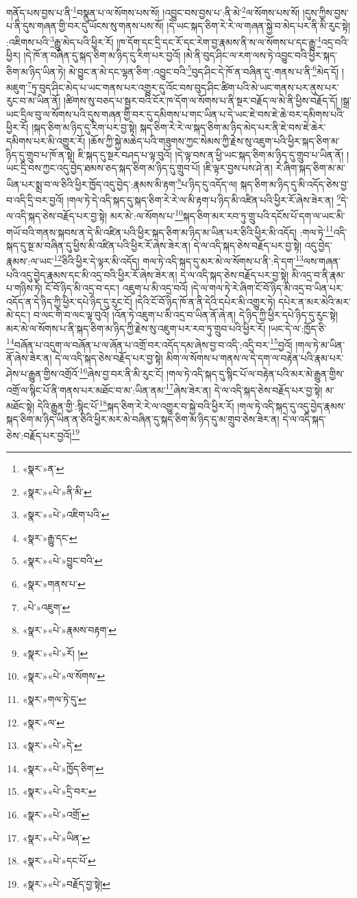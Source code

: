 གནོད་པས་བྱས་པ་ནི་\footnote{«སྣར་»ན་}བསྣུན་པ་ལ་སོགས་པས་སོ། །འབྱུང་བས་བྱས་པ་:ནི་མེ་\footnote{«སྣར་»«པེ་»ནི་མི་}ལ་སོགས་པས་སོ། །དུས་ཀྱིས་བྱས་པ་ནི་དུས་གཞན་གྱི་བར་དུ་ཡོངས་སུ་གནས་པས་སོ། །དེ་ཡང་སྐད་ཅིག་རེ་རེ་ལ་གཞན་སྐྱེ་བ་མེད་པར་ནི་མི་རུང་སྟེ། :འཇིགས་པའི་\footnote{«སྣར་»«པེ་»འཇིག་པའི་}རྒྱུ་མེད་པའི་ཕྱིར་རོ། །ཁ་དོག་དང་དྲི་དང་རོ་དང་རེག་བྱ་རྣམས་ནི་ས་ལ་སོགས་པ་དང་རྒྱུ་\footnote{«སྣར་»རྒྱུ་དང་}འདྲ་བའི་ཕྱིར། །དེ་ཁོ་ན་བཞིན་དུ་སྐད་ཅིག་མ་ཉིད་དུ་རིག་པར་བྱའོ། །མེ་ནི་བུད་ཤིང་ལ་རག་ལས་ཏེ་འབྱུང་བའི་ཕྱིར་སྐད་ཅིག་མ་ཉིད་ཡིན་ཏེ། མེ་བྱུང་ན་མེ་དང་ལྷན་ཅིག་:འབྱུང་བའི་\footnote{«སྣར་»«པེ་»བྱུང་བའི་}བུད་ཤིང་དེ་ཁོ་ན་བཞིན་དུ་:གནས་པ་ནི་\footnote{«སྣར་»གནས་པ་}མེད་དོ། །མཇུག་\footnote{«པེ་»འཇུག་}ཏུ་བུད་ཤིང་མེད་པ་ཡང་གནས་པར་འགྱུར་དུ་འོང་བས་བུད་ཤིང་ཚིག་པའི་མེ་ཡང་གནས་པར་ནུས་པར་རུང་བ་མ་ཡིན་ནོ། །ཚིགས་སུ་བཅད་པ་སྦྱར་བའི་ངོར་ཁ་དོག་ལ་སོགས་པ་ནི་སྔར་བརྗོད་ལ་མེ་ནི་ཕྱིས་བརྗོད་དོ། །སྒྲ་ཡང་དྲིལ་བུ་ལ་སོགས་པའི་དུས་གཞན་གྱི་བར་དུ་དམིགས་པ་གང་ཡིན་པ་དེ་ཡང་ཇེ་བས་ཇེ་ཆེ་བར་དམིགས་པའི་ཕྱིར་རོ། །སྐད་ཅིག་མ་ཉིད་དུ་རིག་པར་བྱ་སྟེ། སྐད་ཅིག་རེ་རེ་ལ་སྐད་ཅིག་མ་ཉིད་མེད་པར་ནི་ཇེ་བས་ཇེ་ཆེར་དམིགས་པར་མི་འགྱུར་རོ། །ཆོས་ཀྱི་སྐྱེ་མཆེད་པའི་གཟུགས་ཀྱང་སེམས་ཀྱི་རྗེས་སུ་འཇུག་པའི་ཕྱིར་སྐད་ཅིག་མ་ཉིད་དུ་གྲུབ་པ་ཁོ་ན་སྟེ། ཇི་སྐད་དུ་སྔར་བཤད་པ་ལྟ་བུའོ། །དེ་ལྟ་བས་ན་ཕྱི་ཡང་སྐད་ཅིག་མ་ཉིད་དུ་གྲུབ་པ་ཡིན་ནོ། །ཡང་དྲི་བས་ཀྱང་འདུ་བྱེད་ཐམས་ཅད་སྐད་ཅིག་མ་ཉིད་དུ་གྲུབ་པོ། །ཇི་ལྟར་བྱས་པས་ཤེ་ན། རེ་ཞིག་སྐད་ཅིག་མ་མ་ཡིན་པར་སྨྲ་བ་ལ་ཅིའི་ཕྱིར་ཁྱོད་འདུ་བྱེད་:རྣམས་མི་རྟག་\footnote{«སྣར་»«པེ་»རྣམས་བརྟག་}པ་ཉིད་དུ་འདོད་ལ། སྐད་ཅིག་མ་ཉིད་དུ་མི་འདོད་ཅེས་བྱ་བ་འདི་དྲི་བར་བྱའོ། །གལ་ཏེ་དེ་འདི་སྐད་དུ་སྐད་ཅིག་རེ་རེ་ལ་མི་རྟག་པ་ཉིད་མི་འཛིན་པའི་ཕྱིར་རོ་ཞེས་ཟེར་ན། \footnote{«སྣར་»«པེ་»རོ། ། }དེ་ལ་འདི་སྐད་ཅེས་བརྗོད་པར་བྱ་སྟེ། མར་མེ་:ལ་སོགས་པ་\footnote{«སྣར་»«པེ་»ལ་སོགས་}སྐད་ཅིག་མར་རབ་ཏུ་གྲུ་པའི་དངོས་པོ་དག་ལ་ཡང་མི་གཡོ་བའི་གནས་སྐབས་ན་དེ་མི་འཛིན་པའི་ཕྱིར་སྐད་ཅིག་མ་ཉིད་མ་ཡིན་པར་ཅིའི་ཕྱིར་མི་འདོད། :གལ་ཏེ་\footnote{«སྣར་»གལ་ཏེ་དུ་}འདི་སྐད་དུ་སྔ་མ་བཞིན་དུ་ཕྱིས་མི་འཛིན་པའི་ཕྱིར་རོ་ཞེས་ཟེར་ན། དེ་ལ་འདི་སྐད་ཅེས་བརྗོད་པར་བྱ་སྟེ། འདུ་བྱེད་རྣམས་:ལ་ཡང་\footnote{«སྣར་»ལ་}ཅིའི་ཕྱིར་དེ་ལྟར་མི་འདོད། གལ་ཏེ་འདི་སྐད་དུ་མར་མེ་ལ་སོགས་པ་ནི་:དེ་དག་\footnote{«སྣར་»«པེ་»དེ་}ལས་གཞན་པའི་འདུ་བྱེད་རྣམས་དང་མི་འདྲ་བའི་ཕྱིར་རོ་ཞེས་ཟེར་ན། དེ་ལ་འདི་སྐད་ཅེས་བརྗོད་པར་བྱ་སྟེ། མི་འདྲ་བ་ནི་རྣམ་པ་གཉིས་ཏེ། ངོ་བོ་ཉིད་མི་འདྲ་བ་དང་། འཇུག་པ་མི་འདྲ་བའོ། །དེ་ལ་གལ་ཏེ་རེ་ཞིག་ངོ་བོ་ཉིད་མི་འདྲ་བ་ཡིན་པར་འདོད་ན་དེ་ཉིད་ཀྱི་ཕྱིར་དཔེ་ཉིད་དུ་རུང་ངོ། །དེའི་ངོ་བོ་ཉིད་ཁོ་ན་ནི་དེའི་དཔེར་མི་འགྱུར་ཏེ། དཔེར་ན་མར་མེའི་མར་མེ་དང་། བ་ལང་གི་བ་ལང་ལྟ་བུའོ། །འོན་ཏེ་འཇུག་པ་མི་འདྲ་བ་ཡིན་ནོ་ཞེ་ན། དེ་ཉིད་ཀྱི་ཕྱིར་དཔེ་ཉིད་དུ་རུང་སྟེ། མར་མེ་ལ་སོགས་པ་ནི་སྐད་ཅིག་མ་ཉིད་ཀྱི་རྗེས་སུ་འཇུག་པར་རབ་ཏུ་གྲུབ་པའི་ཕྱིར་རོ། །ཡང་དེ་ལ་:ཁྱོད་ཅི་\footnote{«སྣར་»«པེ་»ཁྱོད་ཅིག་}བཞོན་པ་འདུག་ལ་བཞོན་པ་ལ་ཞོན་པ་འགྲོ་བར་འདོད་དམ་ཞེས་བྱ་བ་འདི་:འདྲི་བར་\footnote{«སྣར་»«པེ་»དྲི་བར་}བྱའོ། །གལ་ཏེ་མ་ཡིན་ནོ་ཞེས་ཟེར་ན། དེ་ལ་འདི་སྐད་ཅེས་བརྗོད་པར་བྱ་སྟེ། མིག་ལ་སོགས་པ་གནས་ལ་དེ་དག་ལ་བརྟེན་པའི་རྣམ་པར་ཤེས་པ་རྒྱུན་གྱིས་འགྲོའོ་\footnote{«སྣར་»«པེ་»འགྲོ་}ཞེས་བྱ་བར་ནི་མི་རུང་ངོ། །གལ་ཏེ་འདི་སྐད་དུ་སྙིང་པོ་ལ་བརྟེན་པའི་མར་མེ་རྒྱུན་གྱིས་འགྲོ་ལ་སྙིང་པོ་ནི་གནས་པར་མཐོང་བ་མ་:ཡིན་ནམ་\footnote{«སྣར་»«པེ་»ཡིན་}ཞེས་ཟེར་ན། དེ་ལ་འདི་སྐད་ཅེས་བརྗོད་པར་བྱ་སྟེ། མ་མཐོང་སྟེ། དེའི་རྒྱུན་གྱི་:སྙིང་པོ་\footnote{«སྣར་»«པེ་»དང་པོ་}སྐད་ཅིག་རེ་རེ་ལ་འགྱུར་བ་སྐྱེ་བའི་ཕྱིར་རོ། །གལ་ཏེ་འདི་སྐད་དུ་འདུ་བྱེད་རྣམས་སྐད་ཅིག་མ་ཉིད་ཡིན་ན་ཅིའི་ཕྱིར་མར་མེ་བཞིན་དུ་སྐད་ཅིག་མ་ཉིད་དུ་མ་གྲུབ་ཅེས་ཟེར་ན། དེ་ལ་འདི་སྐད་ཅེས་:བརྗོད་པར་བྱའོ།\footnote{«སྣར་»«པེ་»བརྗོད་བྱ་སྟེ།} 